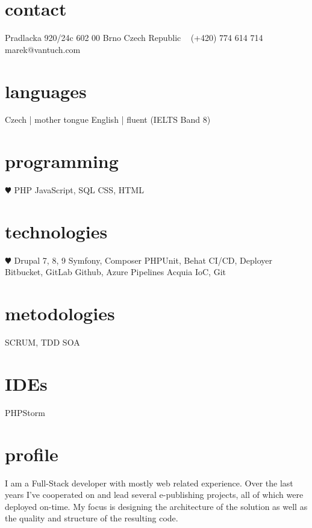 \documentclass[]{friggeri-cv} %
\begin{document}


\begin{aside} %
\section{contact}
Pradlacka 920/24c
602 00 Brno
Czech Republic
~
(+420) 774 614 714
~
marek@vantuch.com
\section{languages}
Czech | mother tongue
English | fluent
(IELTS Band 8)
\section{programming}
{\color{red} $\varheartsuit$} PHP
JavaScript, SQL
CSS, HTML
\section{technologies}
{\color{red} $\varheartsuit$} Drupal 7, 8, 9
Symfony, Composer
PHPUnit, Behat
CI/CD, Deployer
Bitbucket, GitLab
Github, Azure Pipelines
Acquia
IoC, Git
\section{metodologies}
SCRUM, TDD
SOA
\section{IDEs}
PHPStorm
\end{aside}

\section{profile}
I am a Full-Stack developer with mostly web related experience.
Over the last years I've cooperated on and lead several e-publishing projects, all of which were deployed on-time.
My focus is designing the architecture of the solution as well as the quality and structure of the resulting code.
\end{document}
